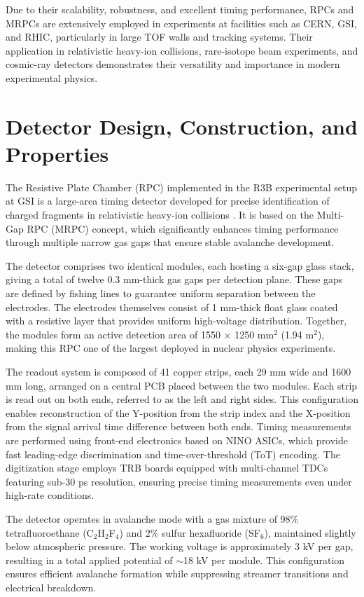 Due to their scalability, robustness, and excellent timing performance, RPCs and MRPCs are extensively employed in experiments at facilities such as CERN, GSI, and RHIC, particularly in large TOF walls and tracking systems. Their application in relativistic heavy-ion collisions, rare-isotope beam experiments, and cosmic-ray detectors demonstrates their versatility and importance in modern experimental physics.

\section{Detector Design, Construction, and Properties}

The Resistive Plate Chamber (\gls{RPC}) implemented in the \gls{R3B} experimental setup at GSI is a large-area timing detector developed for precise identification of charged fragments in relativistic heavy-ion collisions \cite{blanco_ship_2020}. It is based on the Multi-Gap RPC (MRPC) concept, which significantly enhances timing performance through multiple narrow gas gaps that ensure stable avalanche development.

The detector comprises two identical modules, each hosting a six-gap glass stack, giving a total of twelve 0.3 mm-thick gas gaps per detection plane. These gaps are defined by fishing lines to guarantee uniform separation between the electrodes. The electrodes themselves consist of 1 mm-thick float glass coated with a resistive layer that provides uniform high-voltage distribution. Together, the modules form an active detection area of 1550 × 1250 mm$^2$ (1.94 m$^2$), making this RPC one of the largest deployed in nuclear physics experiments.

The readout system is composed of 41 copper strips, each 29 mm wide and 1600 mm long, arranged on a central PCB placed between the two modules. Each strip is read out on both ends, referred to as the left and right sides. This configuration enables reconstruction of the Y-position from the strip index and the X-position from the signal arrival time difference between both ends. Timing measurements are performed using front-end electronics based on NINO ASICs, which provide fast leading-edge discrimination and time-over-threshold (ToT) encoding. The digitization stage employs TRB boards equipped with multi-channel TDCs featuring sub-30 ps resolution, ensuring precise timing measurements even under high-rate conditions.

The detector operates in avalanche mode with a gas mixture of 98\% tetrafluoroethane (C$_2$H$_2$F$_4$) and 2\% sulfur hexafluoride (SF$_6$), maintained slightly below atmospheric pressure. The working voltage is approximately 3 kV per gap, resulting in a total applied potential of $\sim$18 kV per module. This configuration ensures efficient avalanche formation while suppressing streamer transitions and electrical breakdown.

